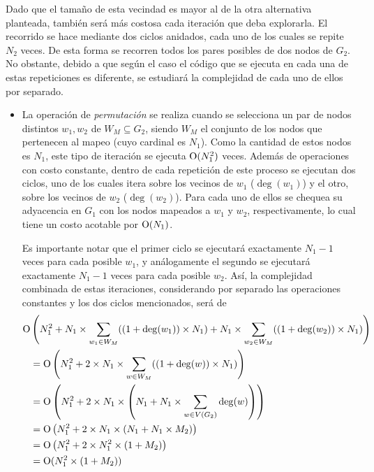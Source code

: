 
Dado que el tamaño de esta vecindad es mayor al de la otra alternativa
planteada, también será más costosa cada iteración que deba explorarla. El
recorrido se hace mediante dos ciclos anidados, cada uno de los cuales se
repite $N_2$ veces. De esta forma se recorren todos los pares posibles de
dos nodos de $G_2$. No obstante, debido a que según el caso el código que se
ejecuta en cada una de estas repeticiones es diferente, se estudiará la
complejidad de cada uno de ellos por separado.

\begin{itemize}
    \item La operación de \emph{permutación} se realiza cuando se
    selecciona un par de nodos distintos $w_1, w_2$ de $W_M \subseteq G_2$,
    siendo $W_M$ el conjunto de los nodos que pertenecen al mapeo (cuyo
    cardinal es $N_1$). Como la cantidad de estos nodos es $N_1$, este tipo de
    iteración se ejecuta $\operatorname{O}(N_1^2)$ veces. Además de operaciones con costo
    constante, dentro de cada repetición de este proceso se ejecutan dos
    ciclos, uno de los cuales itera sobre los vecinos de $w_1$ ($\deg(w_1)$) y
    el otro, sobre los vecinos de $w_2$ ($\deg(w_2)$). Para cada uno de ellos
    se chequea su adyacencia en $G_1$ con los nodos mapeados a $w_1$ y $w_2$,
    respectivamente, lo cual tiene un costo acotable por $\operatorname{O}(N_1)$.

    Es importante notar que el primer ciclo se ejecutará exactamente $N_1 - 1$
    veces para cada posible $w_1$, y análogamente el segundo se ejecutará
    exactamente $N_1 - 1$ veces para cada posible $w_2$. Así, la complejidad
    combinada de estas iteraciones, considerando por separado las operaciones
    constantes y los dos ciclos mencionados, será de
    \begin{align*}
    \operatorname{O} & \left( N_1^2 + N_1 \times \sum_{w_1 \in W_M} ((1 +
    \deg(w_1)) \times N_1) + N_1 \times \sum_{w_2 \in W_M} ((1 + \deg(w_2))
    \times N_1) \right) \\
    &= \operatorname{O} \left( N_1^2 + 2 \times N_1 \times \sum_{w \in W_M} ((1 +
    \deg(w)) \times N_1) \right) \\
    &= \operatorname{O} \left( N_1^2 + 2 \times N_1 \times \left( N_1 + N_1 \times \sum_{w
    \in V(G_2)} \deg(w) \right) \right) \\
    &= \operatorname{O} \left( N_1^2 + 2 \times N_1 \times \left( N_1 + N_1 \times M_2
    \right) \right) \\
    &= \operatorname{O} \left( N_1^2 + 2 \times N_1^2 \times \left( 1 + M_2 \right) \right) \\
    &= \operatorname{O} (N_1^2 \times (1 + M_2))
    \end{align*}


\end{itemize}
